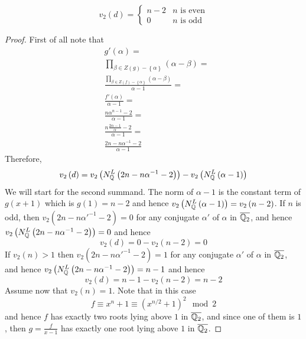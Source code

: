 \documentclass[../main.tex]{subfiles}
\begin{document}
\begin{lemma}
  \label{lem:2-adic-valuation-of-discriminant}
\[
  v_2\left( d \right) = \begin{cases}
    n - 2 & n \text{ is even} \\
    0 & n \text{ is odd}
  \end{cases}
\]
\end{lemma}
\begin{proof}
  First of all note that 
  \begin{align*}
    & g'\left( \alpha \right) = \\
    & \prod_{\beta \in Z\left( g \right) - \left\{ \alpha \right\}}\left( \alpha - \beta \right) = \\
    & \frac{
      \prod_{\beta \in Z\left( f \right) - \left\{ \alpha \right\}}\left( \alpha - \beta \right)
    }{
      \alpha - 1
    } = \\
    & \frac{
      f'\left( \alpha \right)
    }{
      \alpha - 1
    } = \\
    & \frac{
      n \alpha^{n-1} - 2
    }{
      \alpha - 1
    } = \\
    & \frac{
      n \frac{2\alpha - 1}{\alpha} - 2
    }{
      \alpha - 1
    } = \\
    & \frac{
      2n - n\alpha^{-1} - 2
    }{
      \alpha - 1
    }
  \end{align*}
  Therefore, 
  \[
    v_2\left( d \right) = 
    v_2\left( N^L_{\mathbb{Q}}\left( 2n - n\alpha^{-1} - 2\right) \right) - 
    v_2\left( N^L_{\mathbb{Q}}\left( \alpha - 1 \right) \right) 
  \]
  We will start for the second summand.
  The norm of $\alpha - 1$ is the constant term of $g\left( x + 1 \right)$ which is $g\left( 1 \right) = n-2$ and hence $v_2\left( N^L_{\mathbb{Q}}\left( \alpha - 1 \right) \right) = v_2\left( n - 2 \right)$.
  If $n$ is odd, then $v_2\left( 2n - n\alpha'^{-1} - 2 \right) = 0$ for any conjugate $\alpha'$ of $\alpha$ in $\overline{\mathbb{Q}_2}$, and hence $v_2\left( N^L_{\mathbb{Q}}\left( 2n - n\alpha^{-1} - 2 \right) \right) = 0$ and hence 
  \[
    v_2\left( d \right) = 0 - v_2\left( n - 2 \right) = 0
  \]
  If $v_2\left( n \right) > 1$ then $v_2\left( 2n - n\alpha'^{-1} - 2 \right) = 1$ for any conjugate $\alpha'$ of $\alpha$ in $\overline{\mathbb{Q}_2}$, and hence $v_2\left( N^L_{\mathbb{Q}}\left( 2n - n\alpha^{-1} - 2 \right) \right) = n-1$ and hence
  \[
    v_2\left( d \right) = n - 1 - v_2\left( n - 2 \right) = n - 2
  \]
  Assume now that $v_2\left( n \right) = 1$.
  Note that in this case 
  \[
    f \equiv x^n + 1 \equiv \left( x^{n/2} + 1 \right)^2 \mod 2 
  \]
  and hence $f$ has exactly two roots lying above $1$ in $\overline{\mathbb{Q}_2}$, and since one of them is $1$, then $g = \frac{f}{x-1}$ has exactly one root lying above $1$ in $\overline{\mathbb{Q}_2}$.

\end{proof}
\end{document}
